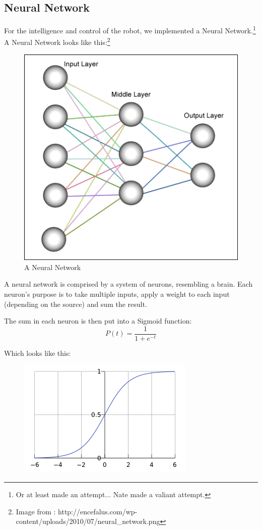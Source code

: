 \documentclass[12pt]{article}
\begin{document}
\subsection{Neural Network}
For the intelligence and control of the robot, we implemented a Neural Network.\footnote{Or at least made an attempt... Nate made a valiant attempt.}  A Neural Network looks like this:\footnote{Image from : http://encefalus.com/wp-content/uploads/2010/07/neural\_network.png}
\begin{figure}[h]
\centerline{\includegraphics[scale=.5]{img/neural_network}}
\caption{A Neural Network}
\end{figure}

A neural network is comprised by a system of neurons, resembling a brain.  Each neuron's purpose is to take multiple inputs, apply a weight to each input (depending on the source) and sum the result.

The sum in each neuron is then put into a Sigmoid function:
\begin{equation}
P(t) = \frac{1}{1+e^{-t}}
\end{equation}

Which looks like this:
\begin{figure}[h]
\centerline{\includegraphics[scale=.6]{img/sigmoid}}
\end{figure}
\end{document}
